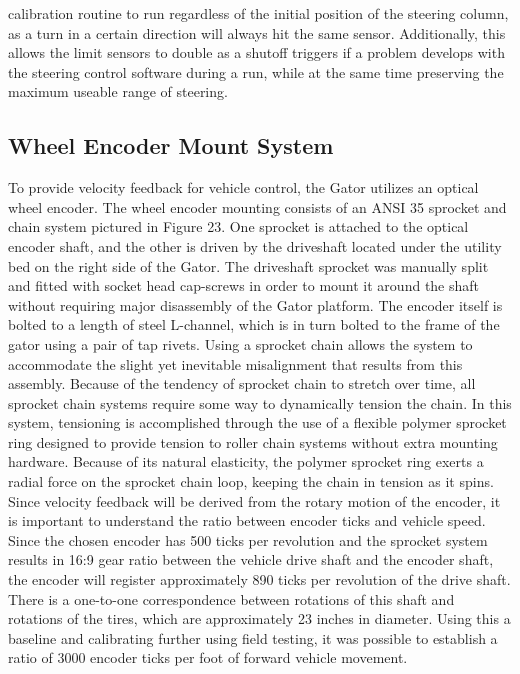 

\noindent calibration routine to run regardless of the initial position of the steering column, as a turn in a certain direction will always hit the same sensor. Additionally, this allows the limit sensors to double as a shutoff triggers if a problem develops with the steering control software during a run, while at the same time preserving the maximum useable range of steering.

\subsection{Wheel Encoder Mount System}
To provide velocity feedback for vehicle control, the Gator utilizes an optical wheel encoder. The wheel encoder mounting consists of an ANSI 35 sprocket and chain system pictured in Figure 23. One sprocket is attached to the optical encoder shaft, and the other is driven by the driveshaft located under the utility bed on the right side of the Gator. The driveshaft sprocket was manually split and fitted with socket head cap-screws in order to mount it around the shaft without requiring major disassembly of the Gator platform. The encoder itself is bolted to a length of steel L-channel, which is in turn bolted to the frame of the gator using a pair of tap rivets. Using a sprocket chain allows the system to accommodate the slight yet inevitable misalignment that results from this assembly. Because of the tendency of sprocket chain to stretch over time, all sprocket chain systems require some way to dynamically tension the chain. In this system, tensioning is accomplished through the use of a flexible polymer sprocket ring designed to provide tension to roller chain systems without extra mounting hardware. Because of its natural elasticity, the polymer sprocket ring exerts a radial force on the sprocket chain loop, keeping the chain in tension
as it spins. Since velocity feedback will be derived from the rotary motion of the encoder, it is important to understand the ratio between encoder ticks and vehicle speed. Since the chosen encoder has 500 ticks per revolution and the sprocket system results in 16:9 gear ratio between the vehicle drive shaft and the encoder shaft, the encoder will register approximately 890 ticks per revolution of the drive shaft. There is a one-to-one correspondence between rotations of this shaft and rotations of the tires, which are approximately 23 inches in diameter. Using this a baseline and calibrating further using field testing, it was possible to establish a ratio of 3000 encoder ticks per foot of forward vehicle movement.

